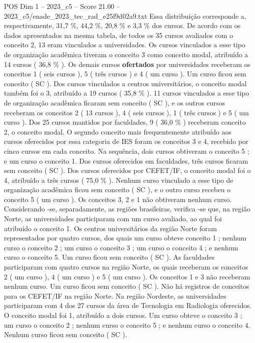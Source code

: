 \begin{textsample}{POS Dim 1 – 2023\_c5 – Score 21.00 – 2023\_c5/enade\_2023\_tec\_rad\_e25f9d02a9.txt}
Essa distribuição corresponde a, respectivamente, 31,7 \%, 44,2 \%, 20,8 \% e 3,3 \% dos cursos.
De acordo com os dados apresentados na mesma tabela, de todos os 35 cursos avaliados com o conceito 2, 13 eram vinculados a universidades.
Os cursos vinculados a esse tipo de organização acadêmica tiveram o conceito 3 como conceito modal, atribuído a 14 cursos ( 36,8 \% ).
Os demais cursos \textbf{ofertados} por universidades receberam os conceitos 1 ( seis cursos ), 5 ( três cursos ) e 4 ( um curso ).
Um curso ficou sem conceito ( SC ).
Dos cursos vinculados a centros universitários, o conceito modal também foi o 3, atribuído a 19 cursos ( 35,8 \% ). 11 cursos vinculados a esse tipo de organização acadêmica ficaram sem conceito ( SC ), e os outros cursos receberam os conceitos 2 ( 13 cursos ), 4 ( seis cursos ), 1 ( três cursos ) e 5 ( um curso ).
Dos 25 cursos mantidos por faculdades, 9 ( 36,0 \% ) receberam conceito 2, o conceito modal.
O segundo conceito mais frequentemente atribuído aos cursos oferecidos por essa categoria de IES foram os conceitos 3 e 4, recebido por cinco cursos em cada conceito.
Na sequência, dois cursos obtiveram o conceito 5 ; e um curso o conceito 1.
Dos cursos oferecidos em faculdades, três cursos ficaram sem conceito ( SC ).
Dos cursos oferecidos por CEFET/IF, o conceito modal foi o 4, atribuído a três cursos ( 75,0 \% ).
Nenhum curso vinculado a esse tipo de organização acadêmica ficou sem conceito ( SC ), e o outro curso recebeu o conceito 5 ( um curso ).
Os conceitos 3, 2 e 1 não obtiveram nenhum curso.
Considerando -se, separadamente, as regiões brasileiras, verifica -se que, na região Norte, as universidades participaram com um curso avaliado, ao qual foi atribuído o conceito 1.
Os centros universitários da região Norte foram representados por quatro cursos, dos quais um curso obteve conceito 1 ; nenhum curso o conceito 2 ; um curso o conceito 3 ; um curso o conceito 4 ; e nenhum curso o conceito 5.
Um curso ficou sem conceito ( SC ).
As faculdades participaram com quatro cursos na região Norte, os quais receberam os conceitos 2 ( um curso ), 4 ( um curso ) e 5 ( um curso ).
Os conceitos 1 e 3 não receberam nenhum curso.
Um curso ficou sem conceito ( SC ).
Não há registros de conceitos para os CEFET/IF na região Norte.
Na região Nordeste, as universidades participaram com 4 dos 27 cursos da área de Tecnologia em Radiologia oferecidos.
O conceito modal foi 1, atribuído a dois cursos.
Um curso obteve o conceito 3 ; um curso o conceito 2 ; nenhum curso o conceito 5 ; e nenhum curso o conceito 4.
Nenhum curso ficou sem conceito ( SC ).

\end{textsample}
